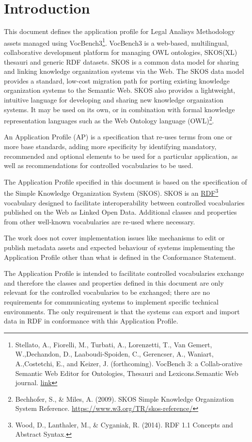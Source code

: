 \section{Introduction}
\label{ariaid-title1}

This document defines the application profile for Legal Analisys
Methodology assets managed using
VocBench3\footnote{Stellato, A., Fiorelli,
	M., Turbati, A., Lorenzetti, T., Van Gemert, W.,Dechandon, D.,
	Laaboudi-Spoiden, C., Gerencser, A., Waniart, A.,Costetchi, E., and
	Keizer, J. (forthcoming). VocBench 3: a Collab-orative Semantic Web
	Editor for Ontologies, Thesauri and Lexicons.Semantic Web journal.
	\href{http://www.semantic-web-journal.net/content/vocbench-3-collaborative-semantic-web-editor-ontologies-thesauri-and-lexicons-1}{link}}. VocBench3 is
a web-based, multilingual, collaborative development platform for
managing OWL ontologies, SKOS(XL) thesauri and generic RDF datasets.
SKOS is a common data model for sharing and linking knowledge
organization systems via the Web. The SKOS data model provides a
standard, low-cost migration path for porting existing knowledge
organization systems to the Semantic Web. SKOS also provides a
lightweight, intuitive language for developing and sharing new knowledge
organization systems. It may be used on its own, or in combination with
formal knowledge representation languages such as the Web Ontology
language (OWL)\footnote{Bechhofer, S., \&
	Miles, A. (2009). SKOS Simple Knowledge Organization System Reference.
	\mbox{\url{https://www.w3.org/TR/skos-reference/}} }.

An Application Profile (AP) is a specification that re-uses terms from
one or more base standards, adding more specificity by identifying
mandatory, recommended and optional elements to be used for a particular
application, as well as recommendations for controlled vocabularies to
be used.

The Application Profile specified in this document is based on the
specification of the Simple Knowledge Organization System (SKOS). SKOS
is an \href{https://www.w3.org/TR/rdf11-concepts/}{RDF}\footnote{Wood, D., Lanthaler,
	M., \& Cyganiak, R. (2014). RDF 1.1 Concepts and Abstract Syntax.}
vocabulary designed to facilitate interoperability between controlled
vocabularies published on the Web as Linked Open Data. Additional
classes and properties from other well-known vocabularies are re-used
where necessary.

The work does not cover implementation issues like mechanisms to edit or
publish metadata assets and expected behaviour of systems implementing
the Application Profile other than what is defined in the Conformance
Statement.

The Application Profile is intended to facilitate controlled
vocabularies exchange and therefore the classes and properties defined
in this document are only relevant for the controlled vocabularies to be
exchanged; there are no requirements for communicating systems to
implement specific technical environments. The only requirement is that
the systems can export and import data in RDF in conformance with this
Application Profile.



